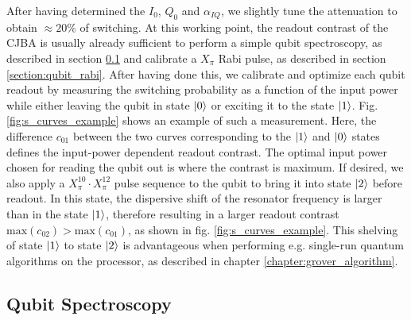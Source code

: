 After having determined the $I_0$, $Q_0$ and $\alpha_{IQ}$, we slightly tune the attenuation to obtain $\approx 20\%$  of switching. At this working point, the readout contrast of the CJBA is usually already sufficient to perform a simple qubit spectroscopy, as described in section \ref{section:qubit_spectroscopy} and calibrate a $X_\pi$ Rabi pulse, as described in section \ref{section:qubit_rabi}. After having done this, we calibrate and optimize each qubit readout by measuring the switching probability as a function of the input power while either leaving the qubit in state $\left| 0 \right>$ or exciting it to the state $\left| 1 \right>$. Fig. \ref{fig:s_curves_example} shows an example of such a measurement. Here, the difference $c_{01}$ between the two curves corresponding to the $\left| 1 \right>$ and $\left| 0 \right>$ states defines the input-power dependent readout contrast. The optimal  input power chosen for reading the qubit out is where the contrast is maximum. If desired, we also apply a $X_\pi^{10}\cdot X_\pi^{12}$ pulse sequence to the qubit to bring it into state $\left| 2 \right>$ before readout. In this state, the dispersive shift of the resonator frequency is larger than in the state $\left| 1 \right>$, therefore resulting in a larger readout contrast $\mathrm{max}(c_{02})>\mathrm{max}(c_{01})$, as shown in fig. \ref{fig:s_curves_example}. This shelving of state $\left| 1 \right>$ to state $\left| 2 \right>$ is advantageous when performing e.g. single-run quantum algorithms on the processor, as described in chapter \ref{chapter:grover_algorithm}.

\subsection{Qubit Spectroscopy} \label{section:qubit_spectroscopy}

